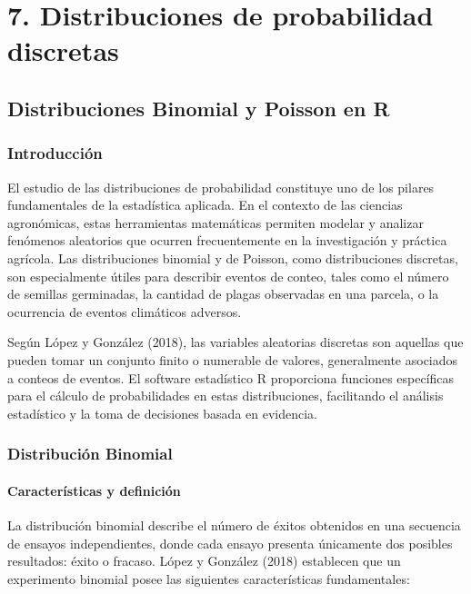 \documentclass[
  spanish,
  letterpaper,
]{book}
\begin{document}
\part{7. Distribuciones de probabilidad discretas}


\chapter{Distribuciones Binomial y Poisson en
R}\label{distribuciones-binomial-y-poisson-en-r}

\section{Introducción}\label{introducciuxf3n-1}

El estudio de las distribuciones de probabilidad constituye uno de los
pilares fundamentales de la estadística aplicada. En el contexto de las
ciencias agronómicas, estas herramientas matemáticas permiten modelar y
analizar fenómenos aleatorios que ocurren frecuentemente en la
investigación y práctica agrícola. Las distribuciones binomial y de
Poisson, como distribuciones discretas, son especialmente útiles para
describir eventos de conteo, tales como el número de semillas
germinadas, la cantidad de plagas observadas en una parcela, o la
ocurrencia de eventos climáticos adversos.

Según López y González (2018), las variables aleatorias discretas son
aquellas que pueden tomar un conjunto finito o numerable de valores,
generalmente asociados a conteos de eventos. El software estadístico R
proporciona funciones específicas para el cálculo de probabilidades en
estas distribuciones, facilitando el análisis estadístico y la toma de
decisiones basada en evidencia.

\section{Distribución Binomial}\label{distribuciuxf3n-binomial}

\subsection{Características y
definición}\label{caracteruxedsticas-y-definiciuxf3n}

La distribución binomial describe el número de éxitos obtenidos en una
secuencia de ensayos independientes, donde cada ensayo presenta
únicamente dos posibles resultados: éxito o fracaso. López y González
(2018) establecen que un experimento binomial posee las siguientes
características fundamentales:
\end{document}
